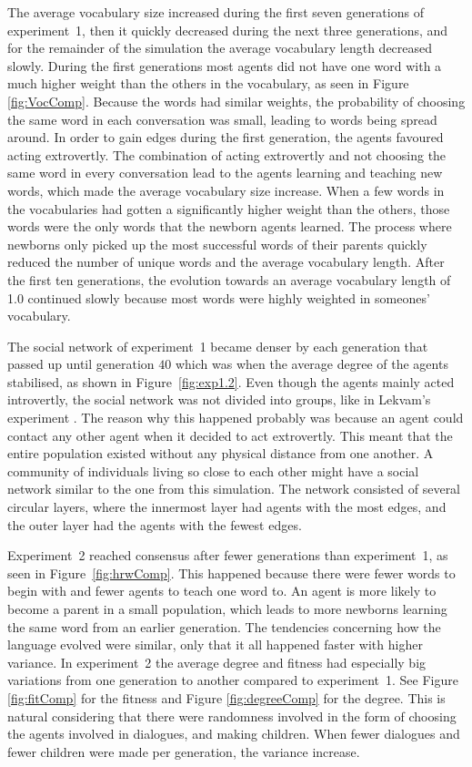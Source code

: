 The average vocabulary size increased during the first seven generations of experiment~1, then it quickly decreased during the next three generations, and for the remainder of the simulation the average vocabulary length decreased slowly. During the first generations most agents did not have one word with a much higher weight than the others in the vocabulary, as seen in Figure \ref{fig:VocComp}. Because the words had similar weights, the probability of choosing the same word in each conversation was small, leading to words being spread around. In order to gain edges during the first generation, the agents favoured acting extrovertly. The combination of acting extrovertly and not choosing the same word in every conversation lead to the agents learning and teaching new words, which made the average vocabulary size increase. When a few words in the vocabularies had gotten a significantly higher weight than the others, those words were the only words that the newborn agents learned. The process where newborns only picked up the most successful words of their parents quickly reduced the number of unique words and the average vocabulary length. After the first ten generations, the evolution towards an average vocabulary length of 1.0 continued slowly because most words were highly weighted in someones' vocabulary.
 
The social network of experiment~1 became denser by each generation that passed up until generation $40$ which was when the average degree of the agents stabilised, as shown in Figure~\ref{fig:exp1.2}. Even though the agents mainly acted introvertly, the social network was not divided into groups, like in Lekvam’s experiment \citep[Section 5.1]{lekvam2014co}. The reason why this happened probably was because an agent could contact any other agent when it decided to act extrovertly. This meant that the entire population existed without any physical distance from one another. A community of individuals living so close to each other might have a social network similar to the one from this simulation. The network consisted of several circular layers, where the innermost layer had agents with the most edges, and the outer layer had the agents with the fewest edges.

Experiment~2 reached consensus after fewer generations than experiment~1, as seen in Figure~\ref{fig:hrwComp}. This happened because there were fewer words to begin with and fewer agents to teach one word to. An agent is more likely to become a parent in a small population, which leads to more newborns learning the same word from an earlier generation. The tendencies concerning how the language evolved were similar, only that it all happened faster with higher variance. In experiment~2 the average degree and fitness had especially big variations from one generation to another compared to experiment~1. See Figure \ref{fig:fitComp} for the fitness and Figure \ref{fig:degreeComp} for the degree. This is natural considering that there were randomness involved in the form of choosing the agents involved in dialogues, and making children. When fewer dialogues and fewer children were made per generation, the variance increase.

